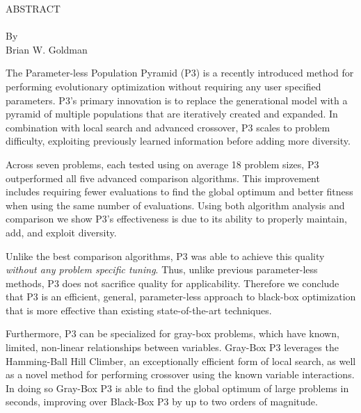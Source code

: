 \thispagestyle{empty} \setcounter{page}{2}
\begin{doublespace}
\begin{centering}
ABSTRACT\\ %
\MyTitle\\ %
By \\ %
Brian W. Goldman\\ %
\end{centering}

The Parameter-less Population Pyramid (P3) is a recently introduced method for performing
evolutionary optimization without requiring any user specified parameters.
P3's primary innovation is to replace the generational model with a pyramid of
multiple populations that are iteratively created and expanded. In combination
with local search and advanced crossover,
P3 scales to problem difficulty, exploiting
previously learned information before adding more diversity.

Across seven problems, each tested using on average 18 problem sizes, P3 outperformed
all five advanced comparison algorithms. This improvement includes requiring fewer evaluations
to find the global optimum and better fitness when using
the same number of evaluations. Using both algorithm analysis and comparison we show P3's
effectiveness is due to its ability to properly maintain, add, and exploit diversity.

Unlike the best comparison algorithms, P3 was able to achieve this quality
\textit{without any
problem specific tuning}. Thus, unlike previous parameter-less methods, P3 does not
sacrifice quality for applicability. Therefore we conclude that
P3 is an efficient, general, parameter-less approach to black-box
optimization that is more effective than existing state-of-the-art techniques.

Furthermore, P3 can be specialized for gray-box problems, which have
known, limited, non-linear relationships
between variables.
Gray-Box P3 leverages the Hamming-Ball Hill Climber, an exceptionally efficient
form of local search, as well as a novel method for performing crossover using the
known variable interactions. In doing so Gray-Box P3 is able to find the global
optimum of large problems in seconds, improving over Black-Box P3 by up to
two orders of magnitude.
\end{doublespace}
\newpage
